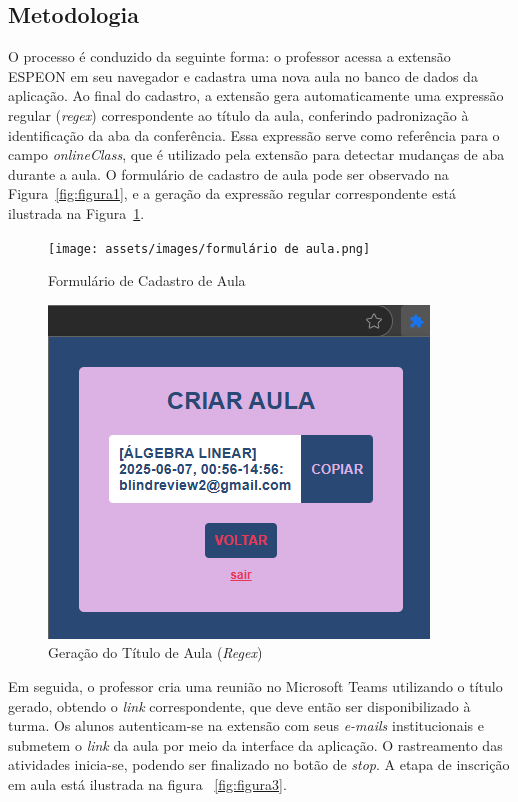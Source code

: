 \subsection{Metodologia}
O processo é conduzido da seguinte forma: o professor acessa a extensão ESPEON em seu navegador e cadastra uma nova aula no banco de dados da aplicação. Ao final do cadastro, a extensão gera automaticamente uma expressão regular (\textit{regex}) correspondente ao título da aula, conferindo padronização à identificação da aba da conferência. Essa expressão serve como referência para o campo \textit{onlineClass}, que é utilizado pela extensão para detectar mudanças de aba durante a aula. O formulário de cadastro de aula pode ser observado na Figura~\ref{fig:figura1}, e a geração da expressão regular correspondente está ilustrada na Figura~\ref{fig:figura2}.

\begin{figure}[H]
\centering
\begin{minipage}{0.48\textwidth}
    \centering
    \texttt{[image: assets/images/formulário de aula.png]}
\caption{Formulário de Cadastro de Aula}
\label{fig:figura1}
\end{minipage}\hfill
\begin{minipage}{0.48\textwidth}
    \centering
\includegraphics[width=.9\textwidth]{assets/images/aula criada.png}
\caption{Geração do Título de Aula (\textit{Regex})}
\label{fig:figura2}
\end{minipage}
\end{figure}

Em seguida, o professor cria uma reunião no Microsoft Teams utilizando o título gerado, obtendo o \textit{link} correspondente, que deve então ser disponibilizado à turma. Os alunos autenticam-se na extensão com seus \textit{e-mails} institucionais e submetem o \textit{link} da aula por meio da interface da aplicação. O rastreamento das atividades inicia-se, podendo ser finalizado no botão de \textit{stop}. A etapa de inscrição em aula está ilustrada na figura ~\ref{fig:figura3}.


